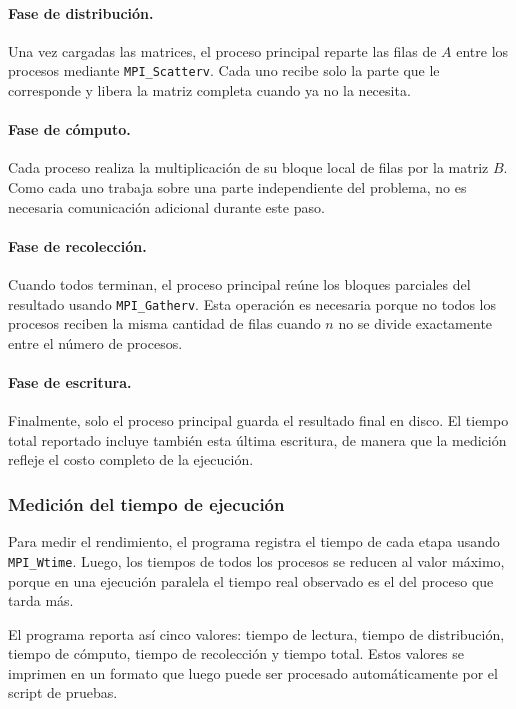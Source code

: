 \paragraph{Fase de distribución.}  
Una vez cargadas las matrices, el proceso principal reparte las filas de \(A\) entre los procesos mediante \texttt{MPI\_Scatterv}. Cada uno recibe solo la parte que le corresponde y libera la matriz completa cuando ya no la necesita.

\paragraph{Fase de cómputo.}  
Cada proceso realiza la multiplicación de su bloque local de filas por la matriz \(B\). Como cada uno trabaja sobre una parte independiente del problema, no es necesaria comunicación adicional durante este paso.

\paragraph{Fase de recolección.}  
Cuando todos terminan, el proceso principal reúne los bloques parciales del resultado usando \texttt{MPI\_Gatherv}. Esta operación es necesaria porque no todos los procesos reciben la misma cantidad de filas cuando \(n\) no se divide exactamente entre el número de procesos.

\paragraph{Fase de escritura.}  
Finalmente, solo el proceso principal guarda el resultado final en disco. El tiempo total reportado incluye también esta última escritura, de manera que la medición refleje el costo completo de la ejecución.

\subsubsection{Medición del tiempo de ejecución}

Para medir el rendimiento, el programa registra el tiempo de cada etapa usando \texttt{MPI\_Wtime}. Luego, los tiempos de todos los procesos se reducen al valor máximo, porque en una ejecución paralela el tiempo real observado es el del proceso que tarda más.

El programa reporta así cinco valores: tiempo de lectura, tiempo de distribución, tiempo de cómputo, tiempo de recolección y tiempo total. Estos valores se imprimen en un formato que luego puede ser procesado automáticamente por el script de pruebas.

